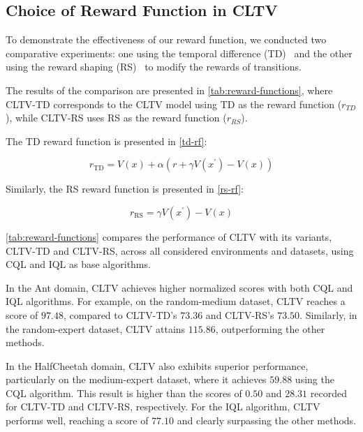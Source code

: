 \subsection{Choice of Reward Function in CLTV}
\label{rew-choice}
To demonstrate the effectiveness of our reward function, we conducted two comparative experiments: one using the temporal difference (TD)~\citep{tdl} and the other using the reward shaping (RS)~\citep{pbrs} to modify the rewards of transitions. 

The results of the comparison are presented in \autoref{tab:reward-functions}, where CLTV-TD corresponds to the CLTV model using TD as the reward function (\( r_{TD} \)), while CLTV-RS uses RS as the reward function (\( r_{RS} \)). 


The TD reward function is presented in \autoref{td-rf}:

\begin{equation}
\label{td-rf}
r_{\mathrm{TD}}=V(x)+\alpha\left(r+\gamma V\left(x^{\prime}\right)-V(x)\right)
\end{equation}

Similarly, the RS reward function is presented in \autoref{rs-rf}:

\begin{equation}
\label{rs-rf}
r_{\mathrm{RS}}=\gamma V\left(x^{\prime}\right)-V(x)
\end{equation}







\autoref{tab:reward-functions} compares the performance of CLTV with its variants, CLTV-TD and CLTV-RS, across all considered environments and datasets, using CQL and IQL as base algorithms.

In the Ant domain, CLTV achieves higher normalized scores with both CQL and IQL algorithms. For example, on the random-medium dataset, CLTV reaches a score of \(97.48\), compared to CLTV-TD's \(73.36\) and CLTV-RS's \(73.50\). Similarly, in the random-expert dataset, CLTV attains \(115.86\), outperforming the other methods. 

In the HalfCheetah domain, CLTV also exhibits superior performance, particularly on the medium-expert dataset, where it achieves \(59.88\) using the CQL algorithm. This result is higher than the scores of \(0.50\) and \(28.31\) recorded for CLTV-TD and CLTV-RS, respectively. For the IQL algorithm, CLTV performs well, reaching a score of \(77.10\) and clearly surpassing the other methods. 

